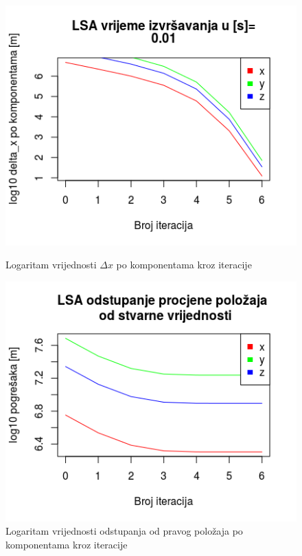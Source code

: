 \documentclass[a4paper,twoside,12pt]{memoir} %
\begin{document}
\begin{figure}[H]
	\begin{minipage}{0.48\textwidth}
		\centering
		\includegraphics[width=1\textwidth]{2LSAdeltal10b}
		\caption{Logaritam vrijednosti $\Delta x$ po komponentama kroz iteracije}
		\label{fig:2LSAdeltal10}
	\end{minipage}%
	\hspace{1cm}
	\begin{minipage}{0.48\textwidth}
		
		\includegraphics[width=1\textwidth]{2LSAreall10b}
		\caption{Logaritam vrijednosti odstupanja od pravog položaja po komponentama kroz iteracije}
		\label{fig:2LSAreall10}
	\end{minipage}%
\end{figure}
\end{document}

